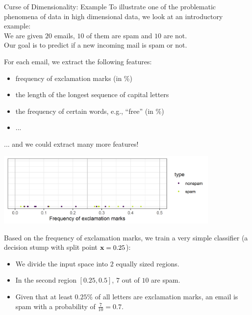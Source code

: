 \begin{vbframe}{Curse of Dimensionality: Example}
To illustrate one of the problematic phenomena of data in high dimensional data, we look at an introductory example: \\ \lz
We are given $20$ emails, $10$ of them are spam and $10$ are not. \\
Our goal is to predict if a new incoming mail is spam or not. 

\medskip

For each email, we extract the following features:

\begin{itemize}
\item frequency of exclamation marks (in \%)
\item the length of the longest sequence of capital letters
\item the frequency of certain words, e.g., \enquote{free} (in \%)
\item ... 
\end{itemize}

... and we could extract many more features!

\framebreak



\vspace*{0.1cm}
\begin{center}
\includegraphics[width = 11cm ]{figure/exclamation_marks_plot.png}
\end{center}

Based on the frequency of exclamation marks, we train a very simple classifier (a decision stump with split point $\mathbf{x} = 0.25$):

\begin{itemize}
\item We divide the input space into $2$ equally sized regions.
\item In the second region $[0.25, 0.5]$, $7$ out of $10$ are spam.
\item Given that at least $0.25\%$ of all letters are exclamation marks, an email is spam with a probability of $\frac{7}{10} = 0.7$.
\end{itemize}
\framebreak



\end{vbframe}

